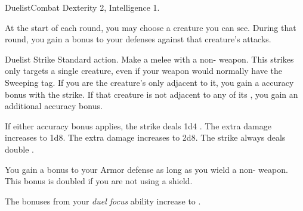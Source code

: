     \begin{feat}{Duelist}{Combat}
        \featpre Dexterity 2, Intelligence 1.

         At the start of each round, you may choose a creature you can see.
        During that round, you gain a  bonus to your defenses against that creature's attacks.

        \begin{activeability}{Duelist Strike}
            \abilityusagetime Standard action.
            \rankline
            Make a melee  with a non- weapon.
            This strikes only targets a single creature, even if your weapon would normally have the Sweeping tag.
            If you are the creature's only  adjacent to it, you gain a  accuracy bonus with the strike.
            If that creature is not adjacent to any of its , you gain an additional  accuracy bonus.

            \rankline
             If either accuracy bonus applies, the strike deals 1d4 .
             The extra damage increases to 1d8.
             The extra damage increases to 2d8.
             The strike always deals double .
        \end{activeability}

         You gain a  bonus to your Armor defense as long as you wield a non- weapon.
        This bonus is doubled if you are not using a shield.

         The bonuses from your \textit{duel focus} ability increase to .
    \end{feat}

